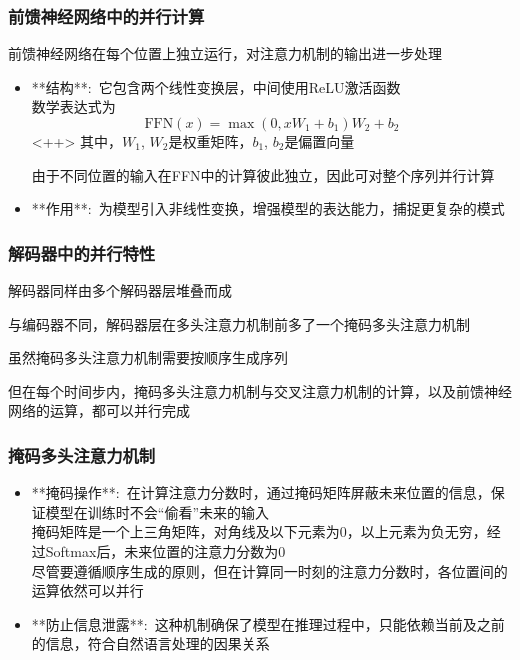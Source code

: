 \begin{frame}
    \frametitle{前馈神经网络中的并行计算}
    前馈神经网络在每个位置上独立运行，对注意力机制的输出进一步处理
    \begin{itemize}
	    \item **结构**:~它包含两个线性变换层，中间使用\textrm{ReLU}激活函数\\
		    数学表达式为
		    \begin{displaymath}
			     \text{FFN}(x) = \max(0, x W_1 + b_1) W_2 + b_2 
		    \end{displaymath}<++>
        其中，$W_1$, $W_2$是权重矩阵，$b_1$, $b_2$是偏置向量

	由于不同位置的输入在\textrm{FFN}中的计算彼此独立，因此可对整个序列并行计算
        \item **作用**:~为模型引入非线性变换，增强模型的表达能力，捕捉更复杂的模式
    \end{itemize}
\end{frame}

\begin{frame}
    \frametitle{解码器中的并行特性}
    解码器同样由多个解码器层堆叠而成

    与编码器不同，解码器层在多头注意力机制前多了一个掩码多头注意力机制

    虽然掩码多头注意力机制需要按顺序生成序列

    但在每个时间步内，掩码多头注意力机制与交叉注意力机制的计算，以及前馈神经网络的运算，都可以并行完成
\end{frame}

\begin{frame}
    \frametitle{掩码多头注意力机制}
    \begin{itemize}
        \item **掩码操作**:~在计算注意力分数时，通过掩码矩阵屏蔽未来位置的信息，保证模型在训练时不会“偷看”未来的输入\\
		掩码矩阵是一个上三角矩阵，对角线及以下元素为0，以上元素为负无穷，经过\textrm{Softmax}后，未来位置的注意力分数为0\\
		尽管要遵循顺序生成的原则，但在计算同一时刻的注意力分数时，各位置间的运算依然可以并行
        \item **防止信息泄露**:~这种机制确保了模型在推理过程中，只能依赖当前及之前的信息，符合自然语言处理的因果关系
    \end{itemize}
\end{frame}

